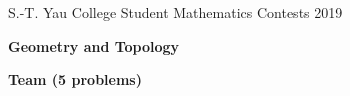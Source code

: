\documentclass[10pt]{article}
\begin{document}








\begin{center}
S.-T. Yau College Student Mathematics Contests 2019

\vspace{0.1cm}

\Large {\bf Geometry and Topology}

\vspace{0.1cm}

\large {\bf Team (5 problems)}

\vspace{0.1cm}
\end{center}
\end{document}
